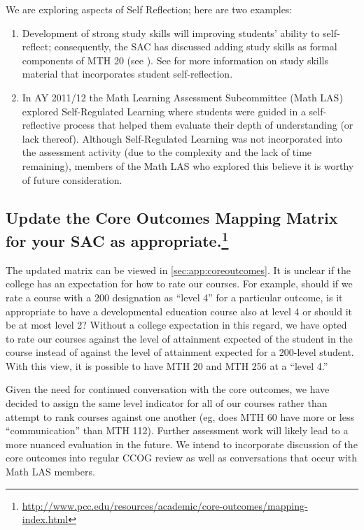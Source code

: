 \begin{description}
  We are exploring aspects of Self Reflection; here are two examples:
  \begin{enumerate}
    \item 
     Development of strong study skills will improving students' ability to self-reflect; consequently,  
      the SAC has discussed adding study skills as formal components
  of MTH 20 (see ).  See 
  for more information on study skills material that incorporates student
  self-reflection. 
\item 
  In AY 2011/12 the Math Learning Assessment Subcommittee (Math LAS) explored
  Self-Regulated Learning where students were guided in a self-reflective
  process that helped them evaluate their depth of understanding (or lack
  thereof).  Although Self-Regulated Learning was not incorporated into the
  assessment activity (due to the complexity and the lack of time remaining),
  members of the Math LAS who explored this believe it is worthy of future
  consideration.
  \end{enumerate}
\end{description}

\subsection[Core outcomes mapping matrix]{Update the Core Outcomes Mapping Matrix for your SAC as
appropriate.\footnote{\url{http://www.pcc.edu/resources/academic/core-outcomes/mapping-index.html}}}
The updated matrix can be viewed in \vref{sec:app:coreoutcomes}. 
It is unclear if the college has an expectation for how to rate our courses.
For example, should if we rate a course with a 200 designation as ``level 4'' for
a particular outcome, is it appropriate to have a developmental education
course also at level 4 or should it be at most level 2? Without a college
expectation in this regard, we have opted to rate our courses against the level
of attainment expected of the student in the course instead of against the
level of attainment expected for a 200-level student. With this view, it is
possible to have MTH 20 and MTH 256 at a ``level 4.'' 

Given the need for continued conversation with the core outcomes, we have
decided to assign the same level indicator for all of our courses rather than
attempt to rank courses against one another (eg, does MTH 60 have more or less
``communication'' than MTH 112). Further assessment work will likely lead to a
more nuanced evaluation in the future. We intend to incorporate discussion of
the core outcomes into regular CCOG review as well as conversations that occur
with Math LAS members.

